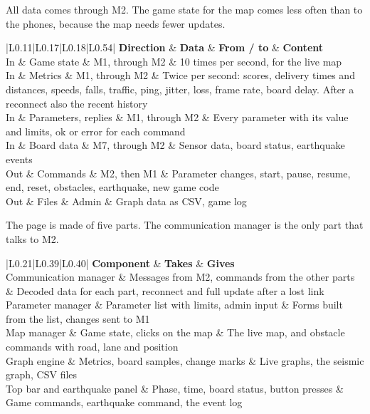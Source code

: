 \documentclass[
  english,
  10pt,
  a4paper,
]{article}
\newcommand{\ckkeep}[1]{\par\noindent\begin{minipage}{\linewidth}\setlength{\parskip}{4pt}#1\end{minipage}\par\smallskip}
\begin{document}

\ckkeep{%
All data comes through M2. The game state for the map comes less often than to the phones, because
the map needs fewer updates.

\begin{tabular}{|L{0.11}|L{0.17}|L{0.18}|L{0.54}|}
\hline \textbf{Direction} & \textbf{Data} & \textbf{From / to} & \textbf{Content} \\ \hline 
In & Game state & M1, through M2 & 10 times per second, for the live map \\ \hline
In & Metrics & M1, through M2 & Twice per second: scores, delivery times and distances, speeds, falls, traffic, ping, jitter, loss, frame rate, board delay. After a reconnect also the recent history \\ \hline
In & Parameters, replies & M1, through M2 & Every parameter with its value and limits, ok or error for each command \\ \hline
In & Board data & M7, through M2 & Sensor data, board status, earthquake events \\ \hline
Out & Commands & M2, then M1 & Parameter changes, start, pause, resume, end, reset, obstacles, earthquake, new game code \\ \hline
Out & Files & Admin & Graph data as CSV, game log \\ \hline
\end{tabular}}


\ckkeep{%
The page is made of five parts. The communication manager is the only part that talks to M2.

\begin{tabular}{|L{0.21}|L{0.39}|L{0.40}|}
\hline \textbf{Component} & \textbf{Takes} & \textbf{Gives} \\ \hline 
Communication manager & Messages from M2, commands from the other parts & Decoded data for each part, reconnect and full update after a lost link \\ \hline
Parameter manager & Parameter list with limits, admin input & Forms built from the list, changes sent to M1 \\ \hline
Map manager & Game state, clicks on the map & The live map, and obstacle commands with road, lane and position \\ \hline
Graph engine & Metrics, board samples, change marks & Live graphs, the seismic graph, CSV files \\ \hline
Top bar and earthquake panel & Phase, time, board status, button presses & Game commands, earthquake command, the event log \\ \hline
\end{tabular}}
\end{document}
